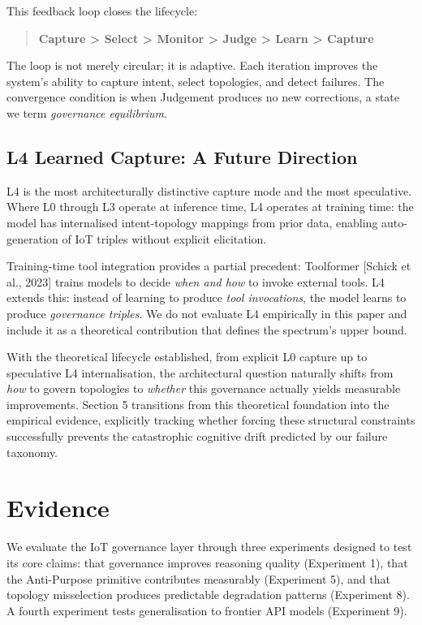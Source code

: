 \documentclass[11pt,a4paper]{article}
\begin{document}
This feedback loop closes the lifecycle:

\begin{quote}
\textbf{Capture \textgreater{} Select \textgreater{} Monitor
\textgreater{} Judge \textgreater{} Learn \textgreater{} Capture}
\end{quote}

The loop is not merely circular; it is adaptive. Each iteration improves
the system's ability to capture intent, select topologies, and detect
failures. The convergence condition is when Judgement produces no new
corrections, a state we term \emph{governance equilibrium}.

\subsection{L4 Learned Capture: A Future
Direction}\label{l4-learned-capture-a-future-direction}

L4 is the most architecturally distinctive capture mode and the most
speculative. Where L0 through L3 operate at inference time, L4 operates
at training time: the model has internalised intent-topology mappings
from prior data, enabling auto-generation of IoT triples without
explicit elicitation.

Training-time tool integration provides a partial precedent: Toolformer
{[}Schick et al., 2023{]} trains models to decide \emph{when and how} to
invoke external tools. L4 extends this: instead of learning to produce
\emph{tool invocations}, the model learns to produce \emph{governance
triples}. We do not evaluate L4 empirically in this paper and include it
as a theoretical contribution that defines the spectrum's upper bound.

With the theoretical lifecycle established, from explicit L0 capture up
to speculative L4 internalisation, the architectural question naturally
shifts from \emph{how} to govern topologies to \emph{whether} this
governance actually yields measurable improvements. Section 5
transitions from this theoretical foundation into the empirical
evidence, explicitly tracking whether forcing these structural
constraints successfully prevents the catastrophic cognitive drift
predicted by our failure taxonomy.

\section{Evidence}\label{evidence}

We evaluate the IoT governance layer through three experiments designed
to test its core claims: that governance improves reasoning quality
(Experiment 1), that the Anti-Purpose primitive contributes measurably
(Experiment 5), and that topology misselection produces predictable
degradation patterns (Experiment 8). A fourth experiment tests
generalisation to frontier API models (Experiment 9).
\end{document}
